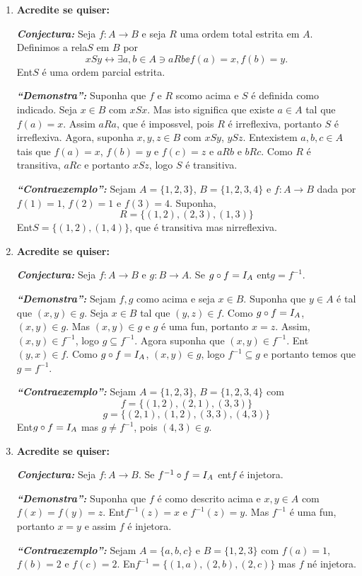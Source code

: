 \begin{enumerate}[{\bf 1.}]
\item {\bf Acredite se quiser:}  

\noindent \textit{\textbf{Conjectura:}} Seja $f:A\to B$ e seja $R$ uma ordem total estrita em $A$. Definimos a rela\cao $S$ em $B$ por
\[
xSy \leftrightarrow \exists a,b\in A \ni aRb\ee f(a)=x,f(b)=y.
\]
Ent\ao $S$ \'e uma ordem parcial estrita.

\noindent \textit{\textbf{``Demonstra\caoi'':}} Suponha que $f$ e $ R$ s\ao como acima e $S$ \'e definida como indicado. Seja $x\in B$ com $xSx$. Mas isto significa que existe $a\in A$ tal que $f(a)=x$. Assim $aRa$, que \'e imposs\ih vel, pois $R$ \'e irreflexiva, portanto $S$ \'e irreflexiva. Agora, suponha $x,y,z\in B$ com $xSy$, $ySz$. Ent\ao existem $a,b,c\in A$ tais que $f(a)=x$, $f(b)=y$ e $f(c)=z$ e $aRb$ e $bRc$. Como $R$ \'e transitiva, $aRc$ e portanto $xSz$, logo $S$ \'e transitiva.

\noindent \textit{\textbf{``Contraexemplo'':}} Sejam $A=\{1,2,3\}$, $B=\{1,2,3,4\}$ e $f:A\to B$ dada por $f(1)=1$, $f(2)=1$ e $f(3)=4$. Suponha,
\[
R=\{(1,2),(2,3),(1,3)\}
\]
Ent\ao $S=\{(1,2),(1,4)\}$, que \'e transitiva mas n\ao irreflexiva.

\item {\bf Acredite se quiser:}  

\noindent \textit{\textbf{Conjectura:}} Seja $f:A\to B$ e $g:B\to A$. Se $g\circ f=I_A$ ent\ao $g=f^{-1}$.

\noindent \textit{\textbf{``Demonstra\caoi'':}} Sejam $f,g$ como acima e seja $x\in B$. Suponha que $y\in A$ \'e tal que $(x,y)\in g$. Seja $x\in B$ tal que $(y,z) \in f$. Como $g\circ f=I_A$, $(x,y)\in g$. Mas $(x,y)\in g$ e $g$ \'e uma fun\caoi, portanto $x=z$. Assim, $(x,y)\in f^{-1}$, logo $g\subseteq f^{-1}$. Agora suponha que $(x,y)\in f^{-1}$. Ent\ao $(y,x)\in f$. Como $g\circ f=I_A$, $(x,y)\in g$, logo $f^{-1}\subseteq g$ e portanto temos que $g=f^{-1}$.

\noindent \textit{\textbf{``Contraexemplo'':}} Sejam $A=\{1,2,3\}$, $B=\{1,2,3,4\}$ com
\[
f=\{(1,2),(2,1),(3,3)\}
\]
\[
g=\{(2,1),(1,2),(3,3),(4,3)\}
\]
Ent\ao $g\circ f=I_A$ mas $g\neq f^{-1}$, pois $(4,3)\in g$.

\item {\bf Acredite se quiser:}  

\noindent \textit{\textbf{Conjectura:}} Seja $f:A\to B$. Se $f^{-1}\circ f=I_A$ ent\ao $f$ \'e injetora.

\noindent \textit{\textbf{``Demonstra\caoi'':}} Suponha que $f$ \'e como descrito acima e $x,y\in A$ com $f(x)=f(y)=z$. Ent\ao $f^{-1}(z)=x$ e $f^{-1}(z)=y$. Mas $f^{-1}$ \'e uma fun\caoi, portanto $x=y$ e assim $f$ \'e injetora.

\noindent \textit{\textbf{``Contraexemplo'':}} Sejam $A=\{a,b,c\}$ e $B=\{1,2,3\}$ com $f(a)=1$, $f(b)=2$ e $f(c)=2$. En\tao $f^{-1}=\{(1,a),(2,b),(2,c)\}$ mas $f$ n\ao \'e injetora.
\end{enumerate}

